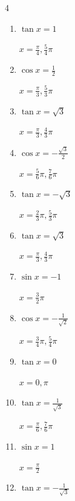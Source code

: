 \begin{multicols}{4}
\begin{enumerate}
        $\displaystyle x = \frac{5}{4}\pi , \frac{7}{4}\pi$

  \item $\displaystyle \tan{x}  = 1$

        $\displaystyle x = \frac{\pi}{4} , \frac{5}{4}\pi$

  \item $\displaystyle \cos{x}  = \frac{1}{2}$

        $\displaystyle x = \frac{\pi}{3} , \frac{5}{3}\pi$

  \item $\displaystyle \tan{x}  = \sqrt{3}$

        $\displaystyle x = \frac{\pi}{3} , \frac{4}{3}\pi$

\columnbreak %

  \item $\displaystyle \cos{x}  = -\frac{\sqrt{3}}{2}$

        $\displaystyle x = \frac{5}{6}\pi , \frac{7}{6}\pi$

  \item $\displaystyle \tan{x}  = -\sqrt{3}$

        $\displaystyle x = \frac{2}{3}\pi , \frac{5}{3}\pi$

  \item $\displaystyle \tan{x}  = \sqrt{3}$

        $\displaystyle x = \frac{\pi}{3} , \frac{4}{3}\pi$

  \item $\displaystyle \sin{x}  = -1$

        $\displaystyle x = \frac{3}{2}\pi$

  \item $\displaystyle \cos{x}  = -\frac{1}{\sqrt{2}}$

        $\displaystyle x = \frac{3}{4}\pi , \frac{5}{4}\pi$

  \item $\displaystyle \tan{x}  = 0$

        $\displaystyle x = 0 , \pi$

  \item $\displaystyle \tan{x}  = \frac{1}{\sqrt{3}}$

        $\displaystyle x = \frac{\pi}{6} , \frac{7}{6}\pi$

  \item $\displaystyle \sin{x}  = 1$

        $\displaystyle x = \frac{\pi}{2}$

  \item $\displaystyle \tan{x}  = -\frac{1}{\sqrt{3}}$


\end{enumerate}
\end{multicols}
